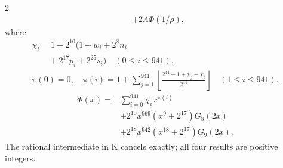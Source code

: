 \documentclass[10pt]{article}
\newcommand{\fl}[1]{\left\lfloor#1\right\rfloor}
\begin{document}
\begin{multicols}{2}
\begin{align*}
&+2\Lambda\Phi(1/\rho),
\end{align*}
where
\[
\begin{gathered}
\chi_i=1+2^{10}(1+w_i+2^8n_i\\
\qquad+2^{17}p_i+2^{25}s_i)\quad(0\le i\le941),\\
\pi(0)=0,\quad\pi(i)=1+\sum_{j=1}^{941}
\fl{\frac{2^{44}-1+\chi_j-\chi_i}{2^{44}}}\quad(1\le i\le941).
\end{gathered}
\]
\[
\begin{split}
\Phi(x)={}&\sum_{i=0}^{941}\chi_i x^{\pi(i)}\\
&+2^{10}x^{969}(x^9+2^{17})G_8(2x)\\
&+2^{18}x^{942}(x^{18}+2^{17})G_9(2x).
\end{split}
\]
The rational intermediate in K cancels exactly; all four results are positive integers.


\end{multicols}
\end{document}
